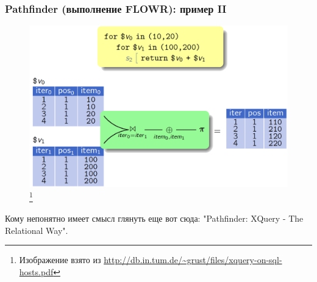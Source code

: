 \documentclass{beamer}
\begin{document}
\begin{frame}[t]
\frametitle{Pathfinder (выполнение FLOWR): пример II}

\begin{figure}[htb]
\includegraphics[width=\textwidth,height=0.66\textheight,keepaspectratio]{pathfinder2.png} 
\footnote{\tiny{Изображение взято из \url{http://db.in.tum.de/~grust/files/xquery-on-sql-hosts.pdf}}}
\end{figure}    

Кому непонятно имеет смысл глянуть еще вот сюда: "Pathfinder: XQuery - The Relational Way".
  
\end{frame}
\end{document}
